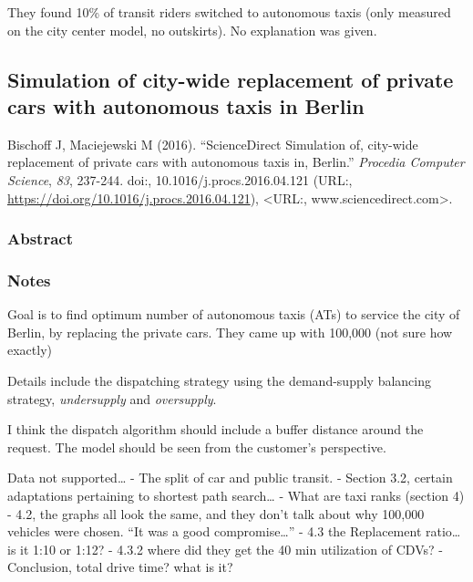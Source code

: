\documentclass[]{article}
\begin{document}
They found 10\% of transit riders switched to autonomous taxis (only
measured on the city center model, no outskirts). No explanation was
given.

\hypertarget{simulation-of-city-wide-replacement-of-private-cars-with-autonomous-taxis-in-berlin}{%
\subsection{Simulation of city-wide replacement of private cars with
autonomous taxis in
Berlin}\label{simulation-of-city-wide-replacement-of-private-cars-with-autonomous-taxis-in-berlin}}

Bischoff J, Maciejewski M (2016). ``ScienceDirect Simulation of,
city-wide replacement of private cars with autonomous taxis in,
Berlin.'' \emph{Procedia Computer Science}, \emph{83}, 237-244. doi:,
10.1016/j.procs.2016.04.121 (URL:,
\url{https://doi.org/10.1016/j.procs.2016.04.121}), \textless URL:,
www.sciencedirect.com\textgreater.

\hypertarget{abstract-1}{%
\subsubsection{Abstract}\label{abstract-1}}

\hypertarget{notes-1}{%
\subsubsection{Notes}\label{notes-1}}

Goal is to find optimum number of autonomous taxis (ATs) to service the
city of Berlin, by replacing the private cars. They came up with 100,000
(not sure how exactly)

Details include the dispatching strategy using the demand-supply
balancing strategy, \emph{undersupply} and \emph{oversupply}.

I think the dispatch algorithm should include a buffer distance around
the request. The model should be seen from the customer's perspective.

Data not supported\ldots{} - The split of car and public transit. -
Section 3.2, certain adaptations pertaining to shortest path
search\ldots{} - What are taxi ranks (section 4) - 4.2, the graphs all
look the same, and they don't talk about why 100,000 vehicles were
chosen. ``It was a good compromise\ldots{}'' - 4.3 the Replacement
ratio\ldots{} is it 1:10 or 1:12? - 4.3.2 where did they get the 40 min
utilization of CDVs? - Conclusion, total drive time? what is it?
\end{document}

